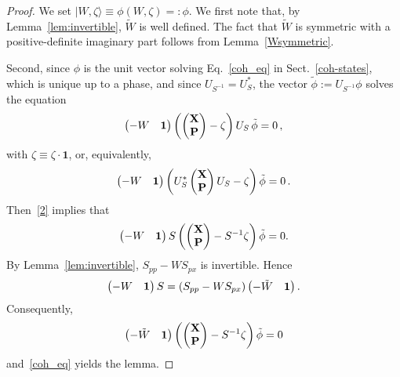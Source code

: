 \documentclass[12pt]{article}
\begin{document}
\begin{proof}
We set $\vert W, \zeta \rangle \equiv \phi(W, \zeta) =: \phi$. We first note that, by Lemma~\ref{lem:invertible}, $\tilde W$ 
is well defined. The fact that $ \tilde W $ is symmetric with a positive-definite imaginary part follows 
from Lemma~\ref{Wsymmetric}.

Second, since $\phi$ is the unit vector solving Eq.~\eqref{coh_eq} in Sect.~\ref{coh-states}, which is unique up to a phase, and since $U_{S^{-1}}=U_S^*$, the vector $\tilde\phi:=U_{S^{-1}}\phi$ solves the equation 
$$ \begin{pmatrix} -W & {\bf{1}} \end{pmatrix} 
\left( \begin{pmatrix} \mathbf X\\\mathbf P \end{pmatrix} -\zeta\right)U_S\,\tilde\phi=0\,,$$
with $\zeta \equiv \zeta\cdot \mathbf{1}$, or, equivalently,
$$\begin{pmatrix} -W & {\bf{1}} \end{pmatrix} \left( U_S^*\begin{pmatrix} \mathbf X\\\mathbf P \end{pmatrix}U_S -\zeta \right)\tilde\phi=0\,.$$
Then~\eqref{2} implies that
$$\begin{pmatrix} -W & {\bf{1}} \end{pmatrix} S\left( \begin{pmatrix} \mathbf X\\\mathbf P \end{pmatrix} 
-S^{-1}\zeta\right) \tilde\phi=0.$$
By Lemma~\ref{lem:invertible}, $S_{pp} - WS_{px} $ is invertible. Hence 
$$ \begin{pmatrix} -W & {\bf{1}} \end{pmatrix} S = (S_{pp} - W S_{px}) \begin{pmatrix} -\tilde W  & {\bf{1}}\end{pmatrix}.$$ 
Consequently,
$$ \begin{pmatrix} -\tilde W  & {\bf{1}}\end{pmatrix} \left(\begin{pmatrix} \mathbf X\\\mathbf P \end{pmatrix}
 -S^{-1}\zeta\right)\tilde\phi = 0$$
and~\eqref{coh_eq} yields the lemma.
\end{proof}
\end{document}
